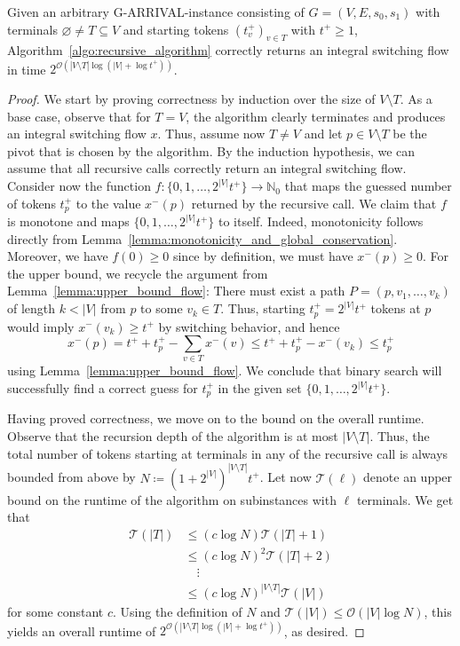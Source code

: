 \documentclass[a4paper,UKenglish,cleveref, autoref, thm-restate]{lipics-v2021}
\newcommand{\N}{\mathbb{N}}
\newcommand{\bigO}{\mathcal{O}}
\let\emptyset\varnothing
\newcommand{\problem}[1]{\textrm{#1}}
\newcommand{\garrival}{\problem{G-ARRIVAL}}
\begin{document}
\begin{lemma}
\label{lemma:correctness_algo_1}
    Given an arbitrary \garrival-instance consisting of $G = (V, E, s_0, s_1)$ with terminals $\emptyset \neq T \subseteq V$ and starting tokens $(t^+_v)_{v \in T}$ with $t^+ \geq 1$, Algorithm~\ref{algo:recursive_algorithm} correctly returns an integral switching flow in time $ 2^{\bigO \left(|V \setminus T| \log ( |V| + \log t^+ ) \right)}$.
\end{lemma}
\begin{proof}
    We start by proving correctness by induction over the size of $V \setminus T$. As a base case, observe that for $T = V$, the algorithm clearly terminates and produces an integral switching flow $x$. Thus, assume now $T \neq V$ and let $p \in V \setminus T$ be the pivot that is chosen by the algorithm. By the induction hypothesis, we can assume that all recursive calls correctly return an integral switching flow. Consider now the function $f : \{0, 1, \dots, 2^{|V| } t^+ \} \rightarrow \N_0$ that maps the guessed number of tokens $t^+_p$ to the value $x^-(p)$ returned by the recursive call. We claim that $f$ is monotone and maps $\{0, 1, \dots, 2^{|V| } t^+ \}$ to itself. Indeed, monotonicity follows directly from Lemma~\ref{lemma:monotonicity_and_global_conservation}. Moreover, we have $f(0) \geq 0$ since by definition, we must have $x^-(p) \geq 0$. For the upper bound, we recycle the argument from Lemma~\ref{lemma:upper_bound_flow}: There must exist a path $P = (p, v_1, \dots, v_k)$ of length $k < |V|$ from $p$ to some $v_k \in T$. Thus, starting $t^+_p = 2^{|V|} t^+$ tokens at $p$ would imply $x^-(v_k) \geq t^+$ by switching behavior, and hence
    \[
        x^-(p) = t^+ + t^+_p - \sum_{v \in T} x^-(v) \leq t^+ + t^+_p - x^-(v_k) \leq t^+_p
    \] 
    using Lemma~\ref{lemma:upper_bound_flow}. We conclude that binary search will successfully find a correct guess for $t^+_p$ in the given set $\{0, 1, \dots, 2^{|V|} t^+\}$.

    Having proved correctness, we move on to the bound on the overall runtime. Observe that the recursion depth of the algorithm is at most $|V \setminus T|$. Thus, the total number of tokens starting at terminals in any of the recursive call is always bounded from above by $N \coloneqq (1 + 2^{|V|})^{|V \setminus T|} t^+$. Let now $\mathcal{T}(\ell)$ denote an upper bound on the runtime of the algorithm on subinstances with $\ell$ terminals. We get that  
    \begin{align*}
        \mathcal{T}(|T|) &\leq (c \log N) \mathcal{T}(|T| + 1) \\
        &\leq (c \log N)^2 \mathcal{T}(|T| + 2) \\
        &\quad \vdots \\
        &\leq (c \log N)^{|V \setminus T|} \mathcal{T}(|V|) 
    \end{align*}
    for some constant $c$. Using the definition of $N$ and $\mathcal{T}(|V|) \leq \bigO( |V| \log N )$, this yields an overall runtime of $2^{\bigO \left(|V \setminus T| \log ( |V| + \log t^+ ) \right)}$, as desired. 
\end{proof}
\end{document}
